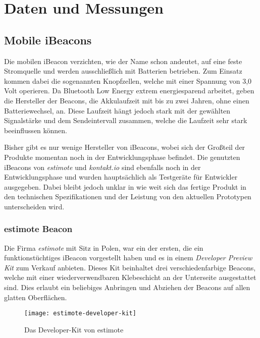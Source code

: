 \chapter{Daten und Messungen}
\label{chap:dataandmeasure}

\section{Mobile iBeacons}
\label{sec:dataandmeasurement:mobilebeacon}
Die mobilen iBeacon verzichten, wie der Name schon andeutet, auf eine feste Stromquelle und werden ausschließlich mit Batterien betrieben.
Zum Einsatz kommen dabei die sogenannten Knopfzellen, welche mit einer Spannung von 3,0 Volt operieren.
Da Bluetooth Low Energy extrem energiesparend arbeitet, geben die Hersteller der Beacons, die Akkulaufzeit mit bis zu zwei Jahren, ohne einen Batteriewechsel, an. Diese Laufzeit hängt jedoch stark mit der gewählten Signalstärke und dem Sendeintervall zusammen, welche die Laufzeit sehr stark beeinflussen können.

Bisher gibt es nur wenige Hersteller von iBeacons, wobei sich der Großteil der Produkte momentan noch in der Entwicklungsphase befindet. Die genutzten iBeacons von \emph{estimote} und \emph{kontakt.io} sind ebenfalls noch in der Entwicklungsphase und wurden hauptsächlich als Testgeräte für Entwickler ausgegeben. Dabei bleibt jedoch unklar in wie weit sich das fertige Produkt in den technischen Spezifikationen und der Leistung von den aktuellen Prototypen unterscheiden wird.

\subsection{estimote Beacon}
\label{sec:dataandmeasurement:mobilebeacon:estimote}
Die Firma \emph{estimote} mit Sitz in Polen, war ein der ersten, die ein funktionstüchtiges iBeacon vorgestellt haben und es in einem \emph{Developer Preview Kit} zum Verkauf anbieten.
Dieses Kit beinhaltet drei verschiedenfarbige Beacons, welche mit einer wiederverwendbaren Klebeschicht an der Unterseite ausgestattet sind. Dies erlaubt ein beliebiges Anbringen und Abziehen der Beacons auf allen glatten Oberflächen.
\begin{figure}[htb!]
		\centering
	\texttt{[image: estimote-developer-kit]}
	\caption{Das Developer-Kit von estimote}
	\label{estimote-developer-kit}
\end{figure}

